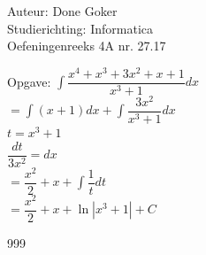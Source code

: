 \documentclass[a4paper]{article}
\begin{document}
  
\noindent \large Auteur: Done Goker \\
\noindent \large Studierichting: Informatica\\
\noindent \large Oefeningenreeks 4A nr. 27.17\\

\medskip

\normalsize
Opgave:
$\displaystyle\int  \dfrac{x^4 + x^3 + 3x^2 + x +1} {x^3 +1} dx$ \\

$= \displaystyle\int (x+ 1) dx  + \displaystyle\int \dfrac{3x^2 }{x^3 + 1}dx$    \\

$ t = x^3 + 1$ \\

$\dfrac{dt}{3x^2} = dx$ \\


$= \dfrac{x^2}{2} + x + \displaystyle\int \dfrac{1}{t} dt $ \\

$= \dfrac{x^2}{2} + x + \ln|x^3 +1| + C $ \\ 


\begin{thebibliography}{999}
\end{thebibliography}
\end{document}
